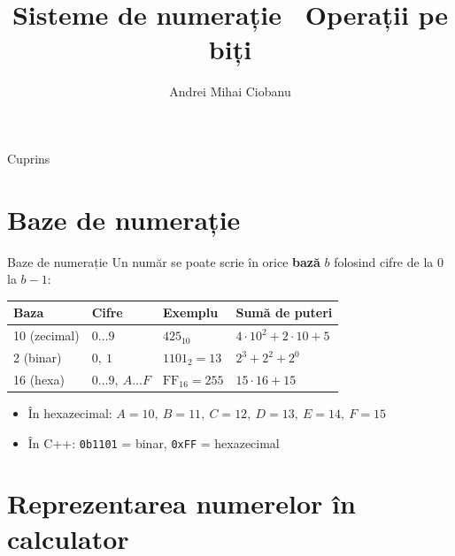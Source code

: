 \documentclass{beamer}
\title{Sisteme de numerație \textbar\ Operații pe biți}
\subtitle{}
\author{Andrei Mihai Ciobanu}
\institute{Algolymp Summer School}
\date{}
\begin{document}
\begin{frame}
  \titlepage
\end{frame}

\begin{frame}{Cuprins}
  \tableofcontents
\end{frame}

\section{Baze de numerație}

\begin{frame}{Baze de numerație}
  Un număr se poate scrie în orice \textbf{bază} $b$ folosind cifre de la $0$ la $b-1$:
  \bigskip

  \begin{tabular}{llll}
    \toprule
    Baza & Cifre & Exemplu & Sumă de puteri \\
    \midrule
    10 (zecimal) & $0 \ldots 9$             & $425_{10}$       & $4 \cdot 10^2 + 2 \cdot 10 + 5$ \\[4pt]
    2 (binar)    & $0,\ 1$                  & $1101_2 = 13$    & $2^3 + 2^2 + 2^0$ \\[4pt]
    16 (hexa)    & $0\ldots 9,\ A\ldots F$  & $\text{FF}_{16} = 255$ & $15 \cdot 16 + 15$ \\
    \bottomrule
  \end{tabular}
  \bigskip
  \begin{itemize}
    \item În hexazecimal: $A=10,\ B=11,\ C=12,\ D=13,\ E=14,\ F=15$
    \item În C++: \lstinline|0b1101| = binar, \lstinline|0xFF| = hexazecimal
  \end{itemize}
\end{frame}

\section{Reprezentarea numerelor în calculator}
\end{document}
